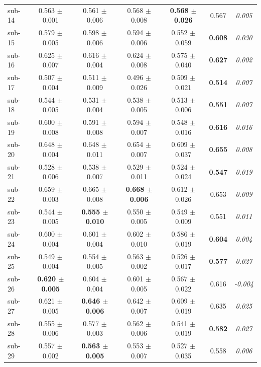\begin{table}[t]
\begin{tabular}{lcccccc}
sub-14 & 0.563 $\pm$ 0.001 & 0.561 $\pm$ 0.006 & 0.568 $\pm$ 0.008 & \textbf{0.568 $\pm$ 0.026} & 0.567 & \textit{0.005} \\
sub-15 & 0.579 $\pm$ 0.005 & 0.598 $\pm$ 0.006 & 0.594 $\pm$ 0.006 & 0.552 $\pm$ 0.059 & \textbf{0.608} & \textit{0.030} \\
sub-16 & 0.625 $\pm$ 0.007 & 0.616 $\pm$ 0.004 & 0.624 $\pm$ 0.008 & 0.575 $\pm$ 0.040 & \textbf{0.627} & \textit{0.002} \\
sub-17 & 0.507 $\pm$ 0.004 & 0.511 $\pm$ 0.009 & 0.496 $\pm$ 0.026 & 0.509 $\pm$ 0.021 & \textbf{0.514} & \textit{0.007} \\
sub-18 & 0.544 $\pm$ 0.005 & 0.531 $\pm$ 0.004 & 0.538 $\pm$ 0.005 & 0.513 $\pm$ 0.006 & \textbf{0.551} & \textit{0.007} \\
sub-19 & 0.600 $\pm$ 0.008 & 0.591 $\pm$ 0.008 & 0.594 $\pm$ 0.007 & 0.548 $\pm$ 0.016 & \textbf{0.616} & \textit{0.016} \\
sub-20 & 0.648 $\pm$ 0.004 & 0.648 $\pm$ 0.011 & 0.654 $\pm$ 0.007 & 0.609 $\pm$ 0.037 & \textbf{0.655} & \textit{0.008} \\
sub-21 & 0.528 $\pm$ 0.006 & 0.538 $\pm$ 0.007 & 0.529 $\pm$ 0.011 & 0.524 $\pm$ 0.024 & \textbf{0.547} & \textit{0.019} \\
sub-22 & 0.659 $\pm$ 0.003 & 0.665 $\pm$ 0.008 & \textbf{0.668 $\pm$ 0.006} & 0.612 $\pm$ 0.026 & 0.653 & \textit{0.009} \\
sub-23 & 0.544 $\pm$ 0.005 & \textbf{0.555 $\pm$ 0.010} & 0.550 $\pm$ 0.005 & 0.549 $\pm$ 0.009 & 0.551 & \textit{0.011} \\
sub-24 & 0.600 $\pm$ 0.004 & 0.601 $\pm$ 0.004 & 0.602 $\pm$ 0.010 & 0.586 $\pm$ 0.019 & \textbf{0.604} & \textit{0.004} \\
sub-25 & 0.549 $\pm$ 0.004 & 0.554 $\pm$ 0.005 & 0.563 $\pm$ 0.002 & 0.526 $\pm$ 0.017 & \textbf{0.577} & \textit{0.027} \\
sub-26 & \textbf{0.620 $\pm$ 0.005} & 0.604 $\pm$ 0.004 & 0.601 $\pm$ 0.005 & 0.567 $\pm$ 0.022 & 0.616 & \textit{-0.004} \\
sub-27 & 0.621 $\pm$ 0.005 & \textbf{0.646 $\pm$ 0.006} & 0.642 $\pm$ 0.007 & 0.609 $\pm$ 0.019 & 0.635 & \textit{0.025} \\
sub-28 & 0.555 $\pm$ 0.006 & 0.577 $\pm$ 0.003 & 0.562 $\pm$ 0.006 & 0.541 $\pm$ 0.019 & \textbf{0.582} & \textit{0.027} \\
sub-29 & 0.557 $\pm$ 0.002 & \textbf{0.563 $\pm$ 0.005} & 0.553 $\pm$ 0.007 & 0.527 $\pm$ 0.035 & 0.558 & \textit{0.006} \\

\end{tabular}
\end{table}
